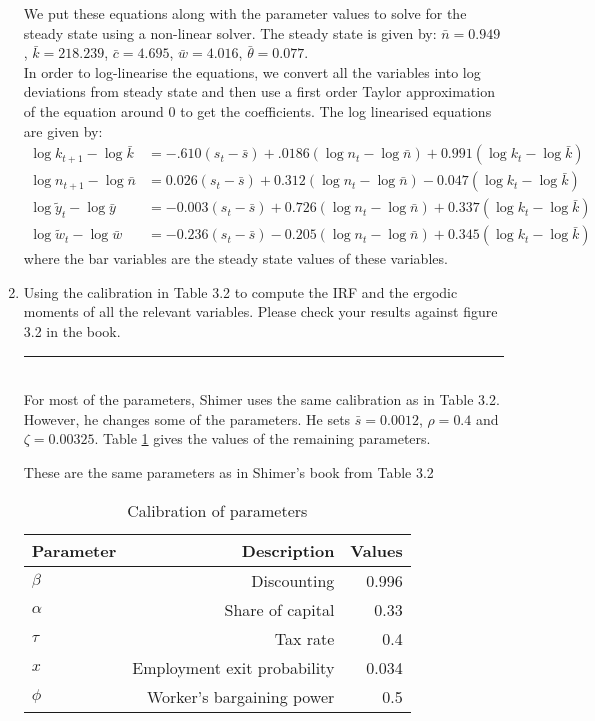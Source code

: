 \documentclass[11pt,letterpaper]{article}
\newcommand{\floatintro}[1]{
  
  \vspace*{0.1in}
  
  {\footnotesize

    #1
    
  }
  
  \vspace*{0.1in} }
\newcommand{\Hline}{\noindent\rule{17cm}{0.5pt}}
\begin{document}
\begin{enumerate}
We put these equations along with the parameter values to solve for
the steady state using a non-linear solver. The steady state is given
by: $\bar n=0.949$, $\bar k=218.239$, $\bar c=4.695$, $\bar w=4.016$,
$\bar \theta = 0.077$.\\
In order to log-linearise the equations, we convert all the variables
into log deviations from steady state and then use a first order
Taylor approximation of the equation around 0 to get the
coefficients. The log linearised equations are given by:
\begin{align*}
  \log k_{t+1} - \log \bar k &= -.610(s_t-\bar s) + .0186(\log n_t - \log
  \bar n) + 0.991(\log k_t - \log \bar k)\\
  \log n_{t+1} - \log \bar n &= 0.026(s_t-\bar s) + 0.312(\log n_t - \log
  \bar n) -0.047(\log k_t - \log \bar k)\\
  \log \tilde y_{t} - \log \bar y &= -0.003(s_t-\bar s) + 0.726(\log n_t - \log
  \bar n) + 0.337(\log k_t - \log \bar k)\\
  \log \tilde w_{t} - \log \bar w &= -0.236(s_t-\bar s) - 0.205(\log n_t - \log
  \bar n) + 0.345(\log k_t - \log \bar k)
\end{align*}
where the bar variables are the steady state values of these variables.
\item Using the calibration in Table 3.2 to compute the IRF and the
  ergodic moments of all the relevant variables. Please check your
  results against figure 3.2 in the book. \\ \Hline \\
For most of the parameters, Shimer uses the same calibration as in
Table 3.2. However, he changes some of the parameters. He sets
$\bar{s} = 0.0012$, $\rho = 0.4$ and $\zeta = 0.00325$. 
Table \ref{tab:calibration} gives the values
of the remaining parameters.
\begin{table}[htbp!]
\label{tab:calibration}
\caption{Calibration of parameters}
\floatintro{These are the same parameters as in Shimer's book from
  Table 3.2}
\centering
\begin{tabular}{lrr}
  \hline
  Parameter & Description & Values \\
  \hline
  $\beta$ & Discounting & 0.996 \\
  $\alpha$ & Share of capital & 0.33 \\
  $\tau$ & Tax rate & 0.4 \\
  $x$ & Employment exit probability & 0.034 \\
  $\phi$ & Worker's bargaining power & 0.5 \\

\end{tabular}
\end{table}
\end{enumerate}
\end{document}

